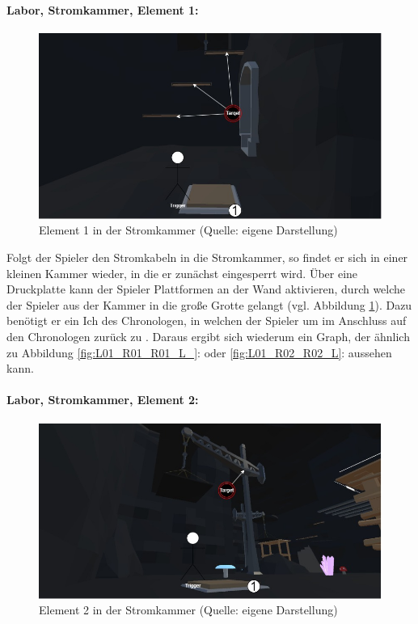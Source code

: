 \paragraph{Labor, Stromkammer, Element 1:}\label{p:lse1}
\begin{figure}[ht]
\centering
\includegraphics[width=0.8\linewidth]{content/pictures/Raetsel-L02_R01_R01.jpg}
\caption{Element 1 in der Stromkammer (Quelle: eigene Darstellung)}
\label{fig:L02_R01_R01}
\end{figure}

Folgt der Spieler den Stromkabeln in die Stromkammer, so findet er sich in einer kleinen Kammer wieder, in die er zunächst eingesperrt wird. Über eine Druckplatte kann der Spieler Plattformen an der Wand aktivieren, durch welche der Spieler aus der Kammer in die große Grotte gelangt (vgl. Abbildung \ref{fig:L02_R01_R01}).
Dazu benötigt er ein Ich des Chronologen, in welchen der Spieler  um im Anschluss auf den Chronologen zurück zu  . Daraus ergibt sich wiederum ein Graph, der ähnlich zu Abbildung \ref{fig:L01_R01_R01_L_}:  oder \ref{fig:L01_R02_R02_L}:  aussehen kann.

\paragraph{Labor, Stromkammer, Element 2:}\label{p:lse2}

\begin{figure}[ht]
\centering
\includegraphics[width=0.8\linewidth]{content/pictures/Raetsel-L02_R01_R02.jpg}
\caption{Element 2 in der Stromkammer (Quelle: eigene Darstellung)}
\label{fig:L02_R01_R02}
\end{figure}


